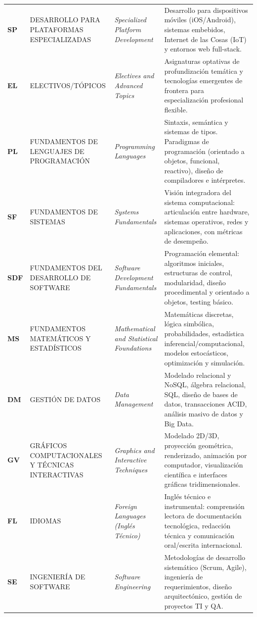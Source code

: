 \documentclass[11pt,a4paper]{article}
\begin{document}
\begin{small}
\begin{longtable}{p{0.9cm} >{\raggedright\arraybackslash}p{4.4cm} >{\raggedright\arraybackslash}p{4.0cm} >{\raggedright\arraybackslash}p{5.4cm}}
\textbf{SP} & DESARROLLO PARA PLATAFORMAS ESPECIALIZADAS & \textit{Specialized Platform Development} & Desarrollo para dispositivos móviles (iOS/Android), sistemas embebidos, Internet de las Cosas (IoT) y entornos web full-stack. \\
\textbf{EL} & ELECTIVOS/TÓPICOS & \textit{Electives and Advanced Topics} & Asignaturas optativas de profundización temática y tecnologías emergentes de frontera para especialización profesional flexible. \\
\textbf{PL} & FUNDAMENTOS DE LENGUAJES DE PROGRAMACIÓN & \textit{Programming Languages} & Sintaxis, semántica y sistemas de tipos. Paradigmas de programación (orientado a objetos, funcional, reactivo), diseño de compiladores e intérpretes. \\
\textbf{SF} & FUNDAMENTOS DE SISTEMAS & \textit{Systems Fundamentals} & Visión integradora del sistema computacional: articulación entre hardware, sistemas operativos, redes y aplicaciones, con métricas de desempeño. \\
\textbf{SDF} & FUNDAMENTOS DEL DESARROLLO DE SOFTWARE & \textit{Software Development Fundamentals} & Programación elemental: algoritmos iniciales, estructuras de control, modularidad, diseño procedimental y orientado a objetos, testing básico. \\
\textbf{MS} & FUNDAMENTOS MATEMÁTICOS Y ESTADÍSTICOS & \textit{Mathematical and Statistical Foundations} & Matemáticas discretas, lógica simbólica, probabilidades, estadística inferencial/computacional, modelos estocásticos, optimización y simulación. \\
\textbf{DM} & GESTIÓN DE DATOS & \textit{Data Management} & Modelado relacional y NoSQL, álgebra relacional, SQL, diseño de bases de datos, transacciones ACID, análisis masivo de datos y Big Data. \\
\textbf{GV} & GRÁFICOS COMPUTACIONALES Y TÉCNICAS INTERACTIVAS & \textit{Graphics and Interactive Techniques} & Modelado 2D/3D, proyección geométrica, renderizado, animación por computador, visualización científica e interfaces gráficas tridimensionales. \\
\textbf{FL} & IDIOMAS & \textit{Foreign Languages (Inglés Técnico)} & Inglés técnico e instrumental: comprensión lectora de documentación tecnológica, redacción técnica y comunicación oral/escrita internacional. \\
\textbf{SE} & INGENIERÍA DE SOFTWARE & \textit{Software Engineering} & Metodologías de desarrollo sistemático (Scrum, Agile), ingeniería de requerimientos, diseño arquitectónico, gestión de proyectos TI y QA. \\

\end{longtable}
\end{small}
\end{document}
